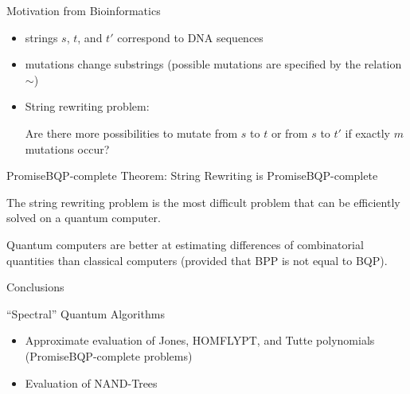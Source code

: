 \documentclass[slideColor]{prosper}
\renewcommand{\>}{\rangle}
\newcommand{\<}{\langle}
\begin{document}

\begin{slide}{Motivation from Bioinformatics}
\begin{itemize}
\item strings $s$, $t$, and $t'$ correspond to DNA sequences 
\item mutations change substrings (possible mutations are specified by the relation $\sim$)
\item String rewriting problem:

Are there more possibilities to mutate from $s$ to $t$ or from $s$ to $t'$ if exactly $m$ mutations occur?
\end{itemize}
\end{slide}


\begin{slide}{PromiseBQP-complete}
Theorem: String Rewriting is PromiseBQP-complete

\bigskip
The string rewriting problem is the most difficult problem that can be efficiently solved on a quantum computer.

\bigskip
Quantum computers are better at estimating differences of combinatorial quantities than classical computers (provided that BPP is not equal to BQP).
\end{slide}


\begin{slide}{Conclusions}

\end{slide}


\begin{slide}{``Spectral'' Quantum Algorithms}

\begin{itemize}
\item Approximate evaluation of Jones, HOMFLYPT, and Tutte polynomials (PromiseBQP-complete problems)

\medskip
\item Evaluation of NAND-Trees

\end{itemize}

\end{slide}

\end{document}

